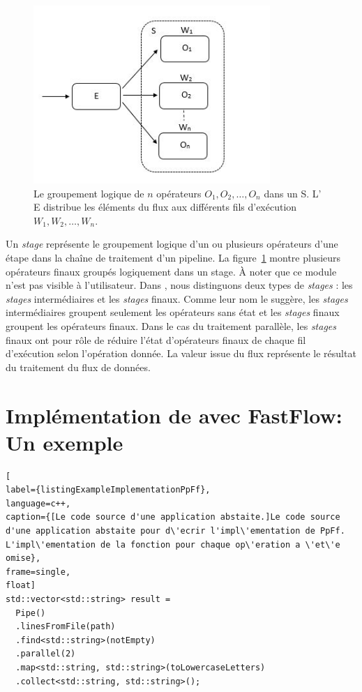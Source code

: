 \begin{figure}[ht]
\centering
     \includegraphics[width=0.8\textwidth]{Figures/Stages.jpg}
      \caption[Le groupement logique de $n$ op\'erateurs $O_1, O_2, \ldots, O_n$ dans un  S.]{Le groupement logique de $n$ op\'erateurs $O_1, O_2, \ldots, O_n$ dans un  S.  L' E distribue les \'el\'ements du flux aux diff\'erents fils d'ex\'ecution $W_1, W_2, \ldots, W_n$.}
       \label{Stages.fig}
\end{figure}

Un \emph{stage} repr\'esente le groupement logique d'un ou plusieurs op\'erateurs d'une \'etape dans la cha\^ine de traitement d'un pipeline. La figure~\ref{Stages.fig} montre plusieurs op\'erateurs finaux group\'es logiquement dans un stage.  \`A noter que ce module n'est pas visible \`a l'utilisateur. Dans , nous distinguons deux types de \emph{stages} : les \emph{stages} interm\'ediaires et les \emph{stages} finaux. Comme leur nom le sugg\`ere, les \emph{stages} interm\'ediaires groupent seulement les op\'erateurs sans \'etat et les \emph{stages} finaux groupent les op\'erateurs finaux. Dans le cas du traitement parall\`ele, les \emph{stages} finaux ont pour r\^ole de r\'eduire l'\'etat d'op\'erateurs finaux de chaque fil d'ex\'ecution selon l'op\'eration donn\'ee. La valeur issue du flux repr\'esente le r\'esultat du traitement du flux de donn\'ees.



\section{Impl\'ementation de  avec FastFlow: Un exemple}

\begin{lstlisting}[
label={listingExampleImplementationPpFf},
language=c++,
caption={[Le code source d'une application abstaite.]Le code source d'une application abstaite pour d\'ecrir l'impl\'ementation de PpFf. L'impl\'ementation de la fonction pour chaque op\'eration a \'et\'e omise},
frame=single,
float]
std::vector<std::string> result = 
  Pipe()
  .linesFromFile(path) 
  .find<std::string>(notEmpty)
  .parallel(2)
  .map<std::string, std::string>(toLowercaseLetters)
  .collect<std::string, std::string>();
\end{lstlisting}

